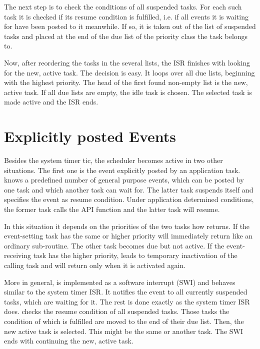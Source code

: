The next step is to check the conditions of all suspended tasks. For each
such task it is checked if its resume condition is fulfilled, i.e. if all
events it is waiting for have been posted to it meanwhile. If so, it is
taken out of the list of suspended tasks and placed at the end of the due
list of the priority class the task belongs to.

Now, after reordering the tasks in the several lists, the ISR finishes
with looking for the new, active task. The decision is easy. It loops
over all due lists, beginning with the highest priority. The head of the
first found non-empty list is the new, active task. If all due lists are
empty, the idle task is chosen. The selected task is made active and the
ISR ends.


\section{Explicitly posted Events}
\label{secManualEvents}

Besides the system timer tic, the scheduler becomes active in two other
situations. The first one is the event explicitly posted by an application
task. \rtos{} knows a predefined number of general purpose events, which
can be posted by one task and which another task can wait for. The latter
task suspends itself and specifies the event as resume condition. Under
application determined conditions, the
former task calls the \rtos{} API function  and the latter
task will resume. 

In this situation it depends on the priorities of the two tasks how
 returns. If the event-setting task has the same or higher
priority  will immediately return like an ordinary
sub-routine. The other task becomes due but not active. If the
event-receiving task has the higher priority,  leads to
temporary inactivation of the calling task and will return only when it is
activated again.

More in general,  is implemented as a software interrupt
(SWI) and behaves similar to the system timer ISR. It notifies the event
to all currently suspended tasks, which are waiting for it. The rest is
done exactly as the system timer ISR does.  checks the
resume condition of all suspended tasks. Those tasks the condition of
which is fulfilled are moved to the end of their due list. Then, the new
active task is selected. This might be the same or another task. The SWI
ends with continuing the new, active task.

